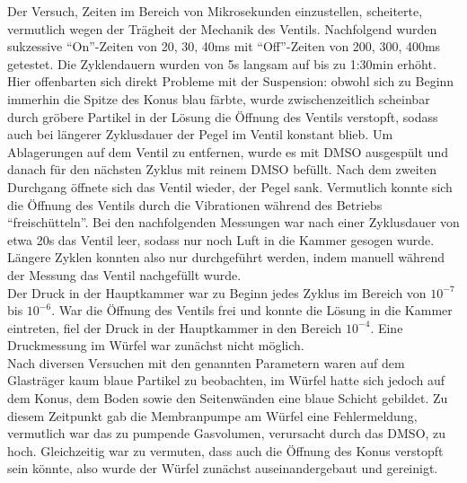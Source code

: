 Der Versuch, Zeiten im Bereich von Mikrosekunden einzustellen, scheiterte, vermutlich wegen der Trägheit der
Mechanik des Ventils. Nachfolgend wurden sukzessive "`On"'-Zeiten von 20, 30, 40ms mit "`Off"'-Zeiten von 200,
300, 400ms getestet. Die Zyklendauern wurden von 5s langsam auf bis zu 1:30min erhöht. Hier offenbarten sich
direkt Probleme mit der Suspension: obwohl sich zu Beginn immerhin die Spitze des Konus blau färbte,
wurde zwischenzeitlich scheinbar durch gröbere Partikel in der Lösung die Öffnung des Ventils verstopft,
sodass auch bei längerer Zyklusdauer der Pegel im Ventil konstant blieb. Um Ablagerungen auf dem Ventil zu
entfernen, wurde es mit DMSO ausgespült und danach für den nächsten Zyklus mit reinem DMSO befüllt. Nach dem
zweiten Durchgang öffnete sich das Ventil wieder, der Pegel sank. Vermutlich konnte sich die Öffnung des
Ventils durch die Vibrationen während des Betriebs "`freischütteln"'. Bei den nachfolgenden Messungen war
nach einer Zyklusdauer von etwa 20s das Ventil leer, sodass nur noch Luft in die Kammer gesogen wurde. Längere
Zyklen konnten also nur durchgeführt werden, indem manuell während der Messung das Ventil nachgefüllt wurde.
\\
Der Druck in der Hauptkammer war zu Beginn jedes Zyklus im Bereich von $10^{-7}$ bis $10^{-6}$. War die
Öffnung des Ventils frei und konnte die Lösung in die Kammer eintreten, fiel der Druck in der Hauptkammer in
den Bereich $10^{-4}$. Eine Druckmessung im Würfel war zunächst nicht möglich.\\
Nach diversen Versuchen mit den genannten Parametern waren auf dem Glasträger kaum blaue Partikel zu
beobachten, im Würfel hatte sich jedoch auf dem Konus, dem Boden sowie den Seitenwänden eine blaue Schicht
gebildet. Zu diesem Zeitpunkt gab die Membranpumpe am Würfel eine Fehlermeldung, vermutlich war das
zu pumpende Gasvolumen, verursacht durch das DMSO, zu hoch. Gleichzeitig war zu vermuten, dass auch die
Öffnung des Konus verstopft sein könnte, also wurde der Würfel zunächst auseinandergebaut und gereinigt.\\


